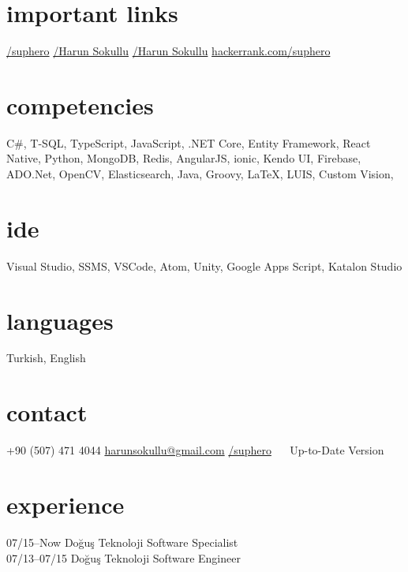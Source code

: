 \documentclass[]{../friggeri-cv} %
\begin{document}

\begin{aside}
\section{important links}
\href{https://github.com/suphero}{\faGithub/suphero}
\href{https://play.google.com/store/apps/developer?id=Harun+Sokullu}{\faAndroid/Harun Sokullu}
\href{https://itunes.apple.com/tr/developer/harun-sokullu/id1265151811}{\faApple/Harun Sokullu}
\href{https://www.hackerrank.com/suphero}{hackerrank.com/suphero}
\section{competencies}
C\#, T-SQL, TypeScript, JavaScript, .NET Core, Entity Framework, React Native, Python, MongoDB, Redis, AngularJS, ionic, Kendo UI, Firebase, ADO.Net, OpenCV, Elasticsearch, Java, Groovy, \LaTeX, LUIS, Custom Vision, 
\section{ide}
Visual Studio, SSMS, VSCode, Atom, Unity, Google Apps Script, Katalon Studio
\section{languages}
Turkish, English
\section{contact}
+90 (507) 471 4044
\href{mailto:harunsokullu@gmail.com}{harunsokullu@gmail.com}
\href{https://www.linkedin.com/in/suphero}{\faLinkedin/suphero}
~~
Up-to-Date Version
\end{aside}

\section{experience}

\begin{entrylist}

\entry
{07/15--Now}
{Doğuş Teknoloji}{}
{Software Specialist}
\\
\entry
{07/13--07/15}
{Doğuş Teknoloji}{}
{Software Engineer}

\end{entrylist}
\end{document}
